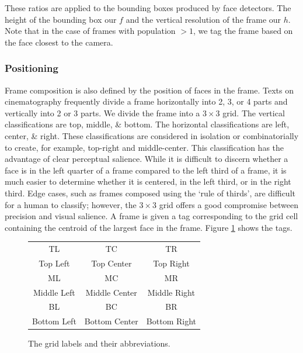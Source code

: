These ratios are applied to the bounding boxes produced by face detectors. The height of the bounding box our $f$ and the vertical resolution of the frame our $h$. Note that in the case of frames with population $> 1$, we tag the frame based on the face closest to the camera. 

\subsubsection*{Positioning}
Frame composition is also defined by the position of faces in the frame. Texts on cinematography frequently divide a frame horizontally into 2, 3, or 4 parts and vertically into 2 or 3 parts. We divide the frame into a $3\times 3$ grid. The vertical classifications are top, middle, \& bottom. The horizontal classifications are left, center, \& right. These classifications are considered in isolation or combinatorially to create, for example, top-right and middle-center. This classification has the advantage of clear perceptual salience. While it is difficult to discern whether a face is in the left quarter of a frame compared to the left third of a frame, it is much easier to determine whether it is centered, in the left third, or in the right third. Edge cases, such as frames composed using the `rule of thirds', are difficult for a human to classify; however, the $3\times 3$ grid offers a good compromise between precision and visual salience. A frame is given a tag corresponding to the grid cell containing the centroid of the largest face in the frame. Figure \ref{fig:gridLabels} shows the tags. %

\begin{figure}[tb]
  \begin{center}
  \begin{tabular}{ c |c |c }
    \large{TL} & \large{TC} & \large{TR}\\
    Top Left & Top Center & Top Right \\
    \hline
    \large{ML} & \large {MC} & \large {MR }\\
    Middle Left & Middle Center & Middle Right \\
    \hline
    \large{BL} & \large {BC} & \large {BR }\\ 
    Bottom Left & Bottom Center & Bottom Right
    \label{fig:gridLabels}
  \end{tabular}
  \caption{The grid labels and their abbreviations.}
\end{center}
\end{figure}

